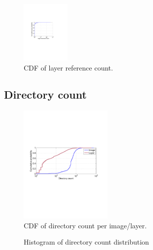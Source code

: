 \begin{figure}
	\centering
	\includegraphics[width=0.21\textwidth]{graphs/shared-cnt-cdf.pdf}
	\caption{CDF of layer reference count.
	}
	\label{fig:reference-cnt}
\end{figure}

\subsection{Directory count}

\begin{figure}
	\centering
	\includegraphics[width=0.4\textwidth]{graphs/dir-cnt-cdf.pdf}
	\caption{CDF of directory count per image/layer.
	}
	\label{fig:reference-cnt}
\end{figure}

\begin{figure}[!t]
	\centering
	\caption{Histogram of directory count distribution}
	\label{fig:reference-cnt}
\end{figure}

